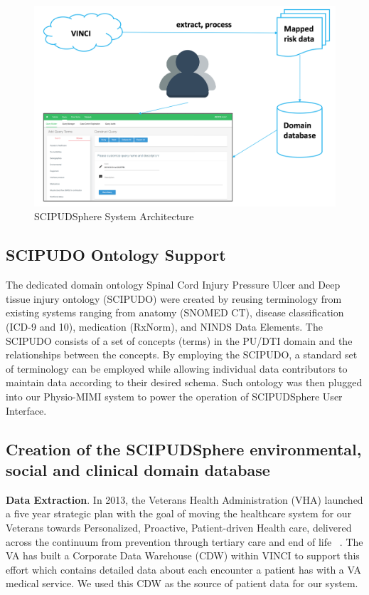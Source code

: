 \documentclass{amia}
\begin{document}
\begin{figure}[h!]
  \centering
  \includegraphics[scale=0.4]{pics/architecture.png}
  \caption{SCIPUDSphere System Architecture}
  \label{architecture}
\end{figure}


\subsection{SCIPUDO Ontology Support}
The dedicated domain ontology Spinal Cord Injury Pressure Ulcer and Deep tissue injury ontology (SCIPUDO) were created by reusing terminology from existing systems ranging from anatomy (SNOMED CT), disease classification (ICD-9 and 10), medication (RxNorm), and NINDS Data Elements. The SCIPUDO consists of a set of concepts (terms) in the PU/DTI domain and the relationships between the concepts. By employing the SCIPUDO, a standard set of terminology can be employed while allowing individual data contributors to maintain data according to their desired schema. Such ontology was then plugged into our Physio-MIMI system to power the operation of SCIPUDSphere User Interface.

\subsection{Creation of the SCIPUDSphere environmental, social and clinical domain database}

{\bf Data Extraction}. In 2013, the Veterans Health Administration (VHA) launched a five year strategic plan with the goal of moving the healthcare system for our Veterans towards Personalized, Proactive, Patient-driven Health care, delivered across the continuum from prevention through tertiary care and end of life ~\cite{vha_plan}. The VA has built a Corporate Data Warehouse (CDW) within VINCI to support this effort which contains detailed data about each encounter a patient has with a VA medical service. We used this CDW as the source of patient data for our system. 
\end{document}
